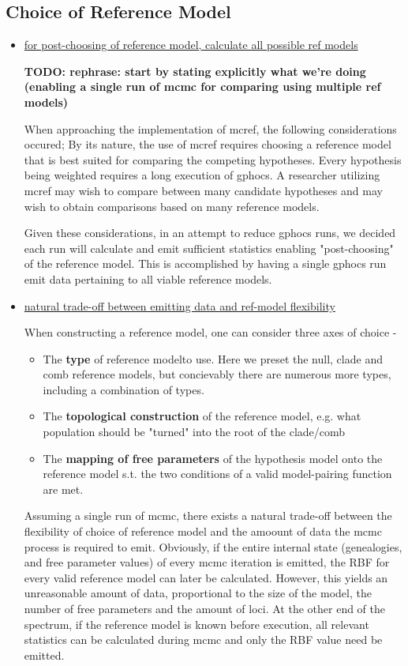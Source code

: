 \documentclass[11pt]{article}
\begin{document}
\subsection{Choice of Reference Model}
\begin{itemize}
\item \underline{for post-choosing of reference model, calculate all possible ref models}

 \textbf{TODO: rephrase: start by stating explicitly what we're doing (enabling a single run of mcmc for comparing using multiple ref models)		}
 
When approaching the implementation of mcref, the following considerations occured; By its nature, the use of mcref requires choosing a reference model that is best suited for comparing the competing hypotheses. Every hypothesis being weighted requires a long execution of gphocs. A researcher utilizing mcref may wish to compare between many candidate hypotheses and may wish to obtain comparisons based on many reference models.

Given these considerations, in an attempt to reduce gphocs runs, we decided each run will calculate and emit sufficient statistics enabling "post-choosing" of the reference model. This is accomplished by having a single gphocs run emit data pertaining to all viable reference models.

\item \underline{natural trade-off between emitting data and ref-model flexibility}

When constructing a reference model, one can consider three axes of choice - 
\begin{itemize}
\item The \textbf{type} of reference modelto use. Here we preset the null, clade and comb reference models, but concievably there are numerous more types, including a combination of types.
\item The \textbf{topological construction} of the reference model, e.g. what population should be "turned" into the root of the clade/comb
\item The \textbf{mapping of free parameters} of the hypothesis model onto the reference model s.t. the two conditions of a valid model-pairing function are met.
\end{itemize}

Assuming a single run of mcmc, there exists a natural trade-off between the flexibility of choice of reference model and the amoount of data the mcmc process is required to emit. Obviously, if the entire internal state (genealogies, and free parameter values) of every mcmc iteration is emitted, the RBF for every valid reference model can later be calculated. However, this yields an unreasonable amount of data, proportional to the size of the model, the number of free parameters and the amount of loci. At the other end of the spectrum, if the reference model is known before execution, all relevant statistics can be calculated during mcmc and only the RBF value need be emitted.



\end{itemize}
\end{document}
